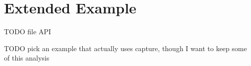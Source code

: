 \documentclass[11pt]{article}
\newcommand\F{\mathcal{F}}
\newcommand{\angles}[1]{\langle#1\rangle}
\begin{document}























\section{Extended Example}
\label{sec:foldl/ee}

TODO file API

TODO pick an example that actually uses capture, though I want to keep some of this analysis
\end{document}
